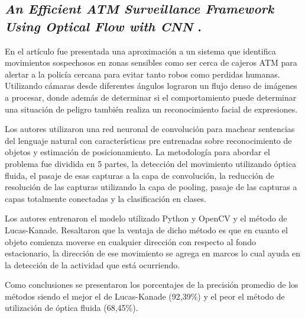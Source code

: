 \subsection{
    \textbf{\emph{An Efficient ATM Surveillance
            Framework Using Optical Flow
            with CNN}
    }
    \cite[pág. 39]{chaudhary_microservices_2020}.
}

En el artículo fue presentada una aproximación a un sistema que identifica movimientos sospechosos en zonas sensibles como ser cerca de cajeros ATM para alertar a la policía cercana para evitar tanto robos como perdidas humanas.
Utilizando cámaras desde diferentes ángulos lograron un flujo denso de imágenes a procesar, donde además de determinar si el comportamiento puede determinar una situación de peligro también realiza un reconocimiento facial de expresiones.
\par

Los autores utilizaron una red neuronal de convolución para machear sentencias del lenguaje natural con
características pre entrenadas sobre reconocimiento de objetos y estimación de posicionamiento.
La metodología para abordar el problema fue dividida en 5 partes, la detección del movimiento utilizando óptica fluida, el pasaje de esas capturas a la capa de convolución, la reducción de resolución de las capturas utilizando la capa de pooling, pasaje de las capturas a capas totalmente conectadas y la clasificación en clases.
\par

Los autores entrenaron el modelo utilizado Python y OpenCV y el método de Lucas-Kanade.
Resaltaron que la ventaja de dicho método es que en cuanto el objeto comienza
moverse en cualquier dirección con respecto al fondo estacionario, la dirección de
ese movimiento se agrega en marcos lo cual ayuda en la detección de la actividad que está ocurriendo.
\par

Como conclusiones se presentaron los porcentajes de la precisión promedio de los métodos siendo el mejor el de Lucas-Kanade (92,39\%) y el peor el método de utilización de óptica fluida (68,45\%).
\par
